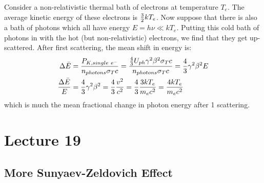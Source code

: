 \documentclass[11pt]{article}
\def\_{\bar}
\begin{document}
Consider a non-relativistic thermal bath of electrons at temperature $T_e$.
The average kinetic energy of these electrons is ${3\over2}kT_e$.  Now
suppose that there is also a bath of photons which all have
energy $E=h\nu\ll kT_e$.  Putting this cold bath of photons in with
the hot (but non-relativistic) electrons, we find that they get up-scattered.
After first scattering, the mean shift in energy is:
$$\begin{aligned}\Delta\_E&={P_{K,single\ e^-}\over n_{photons}\sigma_Tc}=
{{4\over3}U_{ph}\gamma^2\beta^2\sigma_Tc\over n_{photons}\sigma_Tc}=
{4\over3}\gamma^2\beta^2E\\ 
{\Delta\_E\over E}&={4\over3}\gamma^2\beta^2={4\over3}{v^2\over c^2}=
{4\over3}{3kT_e\over m_ec^2}={4kT_e\over m_ec^2}\\ \end{aligned}$$
which is much the mean fractional change in photon energy after 1 scattering.

\section*{ Lecture 19 }

\subsection*{ More Sunyaev-Zeldovich Effect}
\end{document}
